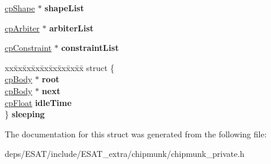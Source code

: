 \begin{DoxyCompactItemize}
\item 
\mbox{\label{structcp_body_a72fc82663f9e8788b87c3690dc71cad1}} 
\mbox{\hyperlink{structcp_shape}{cp\+Shape}} $\ast$ {\bfseries shape\+List}
\item 
\mbox{\label{structcp_body_ad50eb713eb75c7706230bb71c7cb4713}} 
\mbox{\hyperlink{structcp_arbiter}{cp\+Arbiter}} $\ast$ {\bfseries arbiter\+List}
\item 
\mbox{\label{structcp_body_ae76ea4e88d6d4af8837230ff9718df15}} 
\mbox{\hyperlink{structcp_constraint}{cp\+Constraint}} $\ast$ {\bfseries constraint\+List}
\item 
\mbox{\label{structcp_body_a92919e6f7a5df9c4ef735ca898256bb9}} 
\begin{tabbing}
xx\=xx\=xx\=xx\=xx\=xx\=xx\=xx\=xx\=\kill
struct \{\\
\>\mbox{\hyperlink{structcp_body}{cpBody}} $\ast$ {\bfseries root}\\
\>\mbox{\hyperlink{structcp_body}{cpBody}} $\ast$ {\bfseries next}\\
\>\mbox{\hyperlink{group__basic_types_gac1ed65573e035bf892505768c852d8d3}{cpFloat}} {\bfseries idleTime}\\
\} {\bfseries sleeping}\\

\end{tabbing}\end{DoxyCompactItemize}


The documentation for this struct was generated from the following file\+:\begin{DoxyCompactItemize}
\item 
deps/\+E\+S\+A\+T/include/\+E\+S\+A\+T\+\_\+extra/chipmunk/chipmunk\+\_\+private.\+h\end{DoxyCompactItemize}
